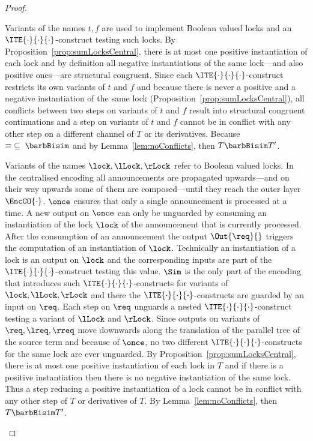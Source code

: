 \documentclass[]{eptcs}
\begin{document}
\begin{proof}
\begin{compactenum}
		\item Variants of the names $ t, f $ are used to implement Boolean valued locks and an $ \ITE{\cdot}{\cdot}{\cdot} $-construct testing such locks. By Proposition~\ref{prop:sumLocksCentral}, there is at most one positive instantiation of each lock and by definition all negative instantiations of the same lock---and also positive ones---are structural congruent. Since each $ \ITE{\cdot}{\cdot}{\cdot} $-construct restricts its own variants of $ t $ and $ f $ and because there is never a positive and a negative instantiation of the same lock (Proposition~\ref{prop:sumLocksCentral}), all conflicts between two steps on variants of $ t $ and $ f $ result into structural congruent continuations and a step on variants of $ t $ and $ f $ cannot be in conflict with any other step on a different channel of $ T $ or its derivatives. Because $ \equiv \; \subseteq \; \barbBisim $ and by Lemma~\ref{lem:noConflicts}, then $ T \barbBisim T' $.
		\item Variants of the names $ \lock, \lLock, \rLock $ refer to Boolean valued locks. In the centralised encoding all announcements are propagated upwards---and on their way upwards some of them are composed---until they reach the outer layer $ \EncCO{\cdot} $. $ \once $ ensures that only a single announcement is processed at a time. A new output on $ \once $ can only be unguarded by consuming an instantiation of the lock $ \lock $ of the announcement that is currently processed. After the consumption of an announcement the output $ \Out{\req}{} $ triggers the computation of an instantiation of $ \lock $. Technically an instantiation of a lock is an output on $ \lock $ and the corresponding inputs are part of the $ \ITE{\cdot}{\cdot}{\cdot} $-construct testing this value. $ \Sim $ is the only part of the encoding that introduces such $ \ITE{\cdot}{\cdot}{\cdot} $-constructs for variants of $ \lock, \lLock, \rLock $ and there the $ \ITE{\cdot}{\cdot}{\cdot} $-constructs are guarded by an input on $ \req $. Each step on $ \req $ unguards a nested $ \ITE{\cdot}{\cdot}{\cdot} $-construct testing a variant of $ \lLock $ and $ \rLock $. Since outputs on variants of $ \req, \lreq, \rreq $ move downwards along the translation of the parallel tree of the source term and because of $ \once $, no two different $ \ITE{\cdot}{\cdot}{\cdot} $-constructs for the same lock are ever unguarded. By Proposition~\ref{prop:sumLocksCentral}, there is at most one positive instantiation of each lock in $ T $ and if there is a positive instantiation then there is no negative instantiation of the same lock. Thus a step reducing a positive instantiation of a lock cannot be in conflict with any other step of $ T $ or derivatives of $ T $. By Lemma~\ref{lem:noConflicts}, then $ T \barbBisim T' $.\\

\end{compactenum}
\end{proof}
\end{document}
